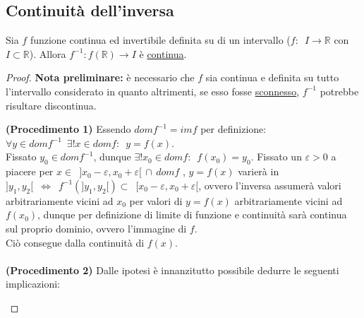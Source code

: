 \documentclass[10pt, oneside]{book}
\theoremstyle{plain}
\begin{document}
\subsection{Continuità dell'inversa}
\hypertarget{inversa}{\begin{ther}
Sia $f$ funzione continua ed invertibile definita su di un intervallo ($f: \enspace I \rightarrow \mathbb{R}$ con $I \subset \mathbb{R}$). Allora $f^{-1} : f(\mathbb{R}) \rightarrow I$ è \underline{continua}.
\end{ther}}
\begin{proof}
\textbf{Nota preliminare:} è necessario che $f$ sia continua e definita su tutto l'intervallo considerato in quanto altrimenti, se esso fosse \underline{sconnesso}, $f^{-1}$ potrebbe risultare discontinua.
\begin{comment}\begin{center}
\begin{tikzpicture}
\begin{axis}[thick, xmin = 0, xmax = 8, ymin = -0.4, ymax = 4, axis x line = middle, axis y line = middle, ticks=none]
\draw[dashed] (axis cs:5.5,1) -- (axis cs:0,1) node[left]{$y_0$};
\draw[thick] (axis cs:1,0) -- (axis cs:4,1);
\draw[thick] (axis cs:5.5,3) -- (axis cs:9.5,6) node[right]{$f$};
\end{axis}
\end{tikzpicture}
\end{center}
\end{comment}
\textbf{(Procedimento 1)} Essendo $dom f^{-1} = im f$ per definizione: $\forall y \in dom f^{-1} \enspace \exists! x \in dom f : \enspace y = f(x)$.\\
Fissato $y_0 \in dom f^{-1}$, dunque $\exists! x_0 \in dom f : \enspace f(x_0) = y_0$. Fissato un $\varepsilon > 0$ a piacere per $x \in \enspace ] x_0 - \varepsilon, x_0 + \varepsilon[ \, \cap \, dom f$ , $y = f(x)$ varierà in $\big]y_1, y_2\big[ \enspace \Leftrightarrow \enspace f^{-1} ( \big] y_1, y_2\big[ ) \subset \enspace [x_0 - \varepsilon, x_0 + \varepsilon[$, ovvero l'inversa assumerà valori arbitrariamente vicini ad $x_0$ per valori di $y=f(x)$ arbitrariamente vicini ad $f(x_0)$, dunque per definizione di limite di funzione e continuità sarà continua sul proprio dominio, ovvero l'immagine di $f$. \\Ciò consegue dalla continuità di $f(x)$.
\\ \\
\textbf{(Procedimento 2)} Dalle ipotesi è innanzitutto possibile dedurre le seguenti implicazioni: \begin{itemize}[label=$\cdot$]

\end{itemize}
\end{proof}
\end{document}
